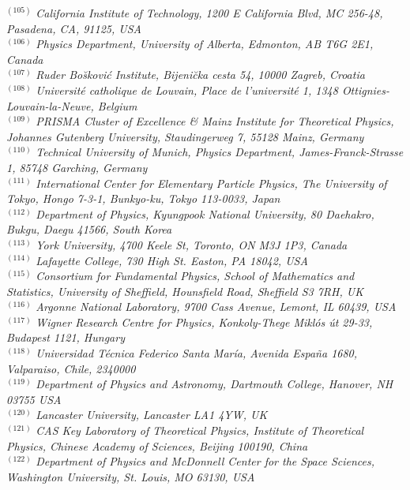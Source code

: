 {\begin{center}
$^{(105)}$ \emph{California Institute of Technology, 1200 E California Blvd, MC 256-48, Pasadena, CA, 91125, USA}\\
$^{(106)}$ \emph{Physics Department, University of Alberta, Edmonton,  AB T6G 2E1, Canada}\\
$^{(107)}$ \emph{Ruder Bo\u skovi\'c Institute, Bijeni\u cka cesta 54, 10000 Zagreb, Croatia}\\
$^{(108)}$ \emph{Universit\'e catholique de Louvain, Place de l'universit\'e 1, 1348 Ottignies-Louvain-la-Neuve, Belgium}\\
$^{(109)}$ \emph{PRISMA Cluster of Excellence \& Mainz Institute for Theoretical Physics, Johannes Gutenberg University, Staudingerweg 7,  55128 Mainz, Germany}\\
$^{(110)}$ \emph{Technical University of Munich, Physics Department, James-Franck-Strasse 1, 85748 Garching, Germany}\\
$^{(111)}$ \emph{International Center for Elementary Particle Physics, The University of Tokyo, Hongo 7-3-1, Bunkyo-ku, Tokyo 113-0033, Japan}\\
$^{(112)}$ \emph{Department of Physics, Kyungpook National University,  80 Daehakro, Bukgu, Daegu 41566, South Korea}\\
$^{(113)}$ \emph{York University, 4700 Keele St, Toronto, ON M3J 1P3, Canada }\\
$^{(114)}$ \emph{Lafayette College, 730 High St. Easton, PA 18042, USA}\\
$^{(115)}$ \emph{Consortium for Fundamental Physics, School of Mathematics and Statistics, University of Sheffield, Hounsfield Road, Sheffield S3 7RH, UK}\\
$^{(116)}$ \emph{Argonne National Laboratory, 9700 Cass Avenue, Lemont, IL 60439, USA}\\
$^{(117)}$ \emph{Wigner Research Centre for Physics, Konkoly-Thege Mikl\'os \'ut 29-33, Budapest 1121, Hungary}\\
$^{(118)}$ \emph{Universidad T\'ecnica Federico Santa Mar\'ia, Avenida Espa\~na 1680, Valparaiso, Chile, 2340000}\\
$^{(119)}$ \emph{Department of Physics and Astronomy, Dartmouth College, Hanover, NH 03755 USA}\\
$^{(120)}$ \emph{Lancaster University, Lancaster LA1 4YW, UK}\\
$^{(121)}$ \emph{CAS Key Laboratory of Theoretical Physics, Institute of Theoretical Physics, Chinese Academy of Sciences, Beijing 100190, China}\\
$^{(122)}$ \emph{Department of Physics and McDonnell Center for the Space Sciences, Washington University, St. Louis, MO 63130, USA}\\

\end{center}}
